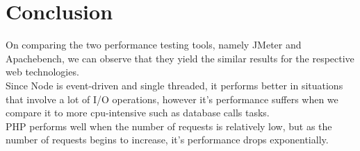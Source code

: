 \documentclass[../thesis.tex]{subfiles}
\begin{document}
\section{Conclusion}
On comparing the two performance testing tools, namely JMeter and Apachebench, we can observe that they yield the similar results for the respective web technologies.
\vspace{5mm} \\
Since Node is event-driven and single threaded, it performs better in situations that involve a lot of I/O operations, however it's performance suffers when we compare it to more cpu-intensive such as database calls tasks.
\vspace{5mm} \\
PHP performs well when the number of requests is relatively low, but as the number of requests begins to increase, it's performance drops exponentially.
\vspace{5mm}
\end{document}
